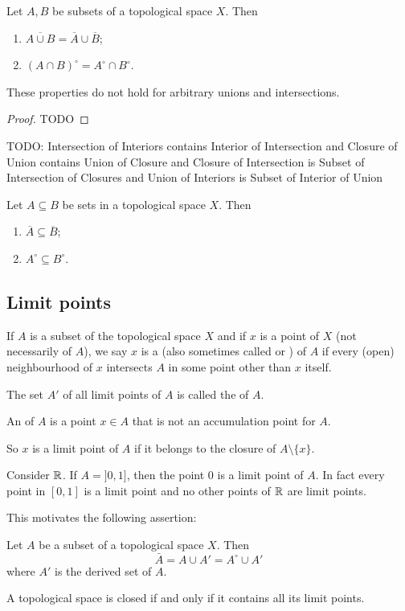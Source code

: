 \begin{lemma}
Let $A,B$ be subsets of a topological space $X$. Then
\begin{enumerate}
\item $\overline{A\cup B} = \overline{A}\cup \overline{B}$;
\item $(A\cap B)^\circ = A^\circ \cap B^\circ$.
\end{enumerate}
These properties do not hold for arbitrary unions and intersections.
\end{lemma}
\begin{proof}
TODO
\end{proof}
\begin{lemma}
TODO: Intersection of Interiors contains Interior of Intersection and Closure of Union contains Union of Closure and Closure of Intersection is Subset of Intersection of Closures and Union of Interiors is Subset of Interior of Union
\end{lemma}

\begin{lemma} \label{closureInteriorSubsets}
Let $A\subseteq B$ be sets in a topological space $X$. Then
\begin{enumerate}
\item $\overline{A} \subseteq \overline{B}$;
\item $A^\circ \subseteq B^\circ$.
\end{enumerate}
\end{lemma}

\subsection{Limit points}
\begin{definition}
If $A$ is a subset of the topological space $X$ and if $x$ is a point of $X$ (not necessarily of $A$), we say $x$ is a  (also sometimes called  or ) of $A$ if every (open) neighbourhood of $x$ intersects $A$ in some point other than $x$ itself.

The set $A'$ of all limit points of $A$ is called the  of $A$.

An  of $A$ is a point $x\in A$ that is not an accumulation point for $A$.
\end{definition}
So $x$ is a limit point of $A$ if it belongs to the closure of $A\setminus \{x\}$.
\begin{example}
Consider $\mathbb{R}$. If $A= ]0,1]$, then the point $0$ is a limit point of $A$. In fact every point in $[0,1]$ is a limit point and no other points of $\mathbb{R}$ are limit points.
\end{example}
This motivates the following assertion:
\begin{proposition}
Let $A$ be a subset of a topological space $X$. Then
\[ \bar{A} = A \cup A' = A^\circ \cup A' \]
where $A'$ is the derived set of $A$.
\end{proposition}
\begin{corollary}
A topological space is closed if and only if it contains all its limit points.
\end{corollary}

